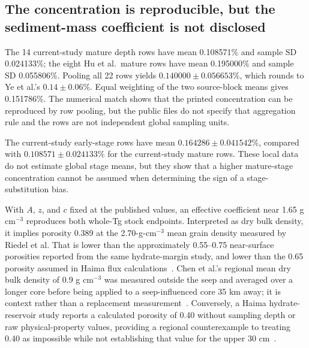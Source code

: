 \documentclass[11pt,letterpaper]{article}
\begin{document}
\subsection{The concentration is reproducible, but the sediment-mass coefficient is not disclosed}

The 14 current-study mature depth rows have mean 0.108571\% and sample SD 0.024133\%; the eight Hu et al.\ mature rows have mean 0.195000\% and sample SD 0.055806\%. Pooling all 22 rows yields $0.140000\pm0.056653\%$, which rounds to Ye et al.'s $0.14\pm0.06\%$. Equal weighting of the two source-block means gives 0.151786\%. The numerical match shows that the printed concentration can be reproduced by row pooling, but the public files do not specify that aggregation rule and the rows are not independent global sampling units.

The current-study early-stage rows have mean $0.164286\pm0.041542\%$, compared with $0.108571\pm0.024133\%$ for the current-study mature rows. These local data do not estimate global stage means, but they show that a higher mature-stage concentration cannot be assumed when determining the sign of a stage-substitution bias.

With $A$, $z$, and $c$ fixed at the published values, an effective coefficient near 1.65 g cm$^{-3}$ reproduces both whole-Tg stock endpoints. Interpreted as dry bulk density, it implies porosity 0.389 at the 2.70-g-cm$^{-3}$ mean grain density measured by Riedel et al. That is lower than the approximately 0.55--0.75 near-surface porosities reported from the same hydrate-margin study, and lower than the 0.65 porosity assumed in Haima flux calculations~\cite{riedel2006,tang2025}. Chen et al.'s regional mean dry bulk density of 0.9 g cm$^{-3}$ was measured outside the seep and averaged over a longer core before being applied to a seep-influenced core 35 km away; it is context rather than a replacement measurement~\cite{chen2024}. Conversely, a Haima hydrate-reservoir study reports a calculated porosity of 0.40 without sampling depth or raw physical-property values, providing a regional counterexample to treating 0.40 as impossible while not establishing that value for the upper 30 cm~\cite{huang2022}.
\end{document}
